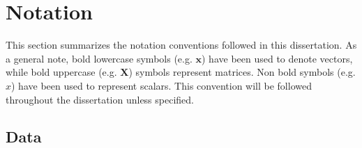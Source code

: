 \chapter*{Notation} \label{ch:notation}
This section summarizes the notation conventions followed in this dissertation. As a general note, bold lowercase symbols (e.g. $\mathbf{x}$) have been used to denote vectors, while bold uppercase (e.g. $\mathbf{X}$) symbols represent matrices. Non bold symbols (e.g. $x$) have been used to represent scalars. This convention will be followed throughout the dissertation unless specified.

\section*{Data }

